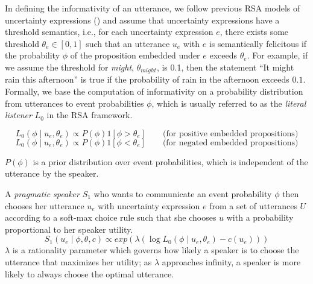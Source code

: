 \documentclass[man, floatsintext]{apa6}
\begin{document}
In defining the informativity of an utterance, we follow previous RSA models of uncertainty expressions (\cite{Lassiter2017b,Herbstritt2019}) 
and assume that uncertainty expressions have a threshold semantics, 
i.e., for each uncertainty expression $e$, there exists some threshold $\theta_e \in [0,1]$ 
such that an utterance $u_e$ with $e$ is semantically felicitous if the probability $\phi$ 
of the proposition embedded under $e$ exceeds $\theta_e$. 
For example, if we assume the threshold for \textit{might}, $\theta_{might}$, is 0.1, then the statement 
``It might rain this afternoon'' is true if the probability of rain in the afternoon exceeds $0.1$. 
Formally, we base the computation of informativity on a probability distribution from utterances to event probabilities $\phi$, 
which is usually referred to as the \textit{literal listener} $L_0$ in the RSA framework. 

$$L_0\left(\phi \mid u_e, \theta_e\right) \propto P(\phi) 1\left[\phi > \theta_e \right] \qquad \mbox{(for positive embedded propositions)}$$
$$L_0\left(\phi \mid u_e, \theta_e\right) \propto P(\phi) 1\left[\phi < \theta_e \right] \qquad \mbox{(for negated embedded propositions)}$$ 

$P(\phi)$ is a prior distribution over event probabilities, which is independent of the utterance by the speaker.

A \textit{pragmatic speaker} $S_1$ who wants to communicate an event probability $\phi$ then chooses her utterance $u_e$ with uncertainty expression $e$ from a set of utterances $U$ according to a soft-max choice rule \parencite{Luce1959,Sutton1998} such that she chooses $u$ with a probability proportional to her speaker utility. 
$$S_1\left(u_e \mid \phi, \theta, c\right) \propto exp \left( \lambda \left( \log L_0\left(\phi \mid u_e, \theta_e\right)  - c(u_e)\right)\right)$$
$\lambda$ is a rationality parameter which governs how likely a speaker is to choose the utterance that maximizes her utility; as $\lambda$ approaches infinity, a speaker is more likely to always choose the optimal utterance.  
\end{document}
